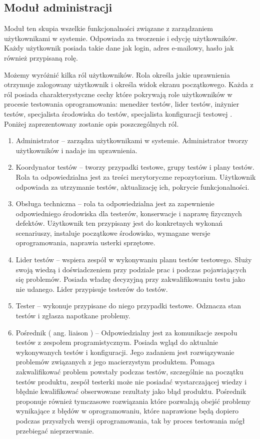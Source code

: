 \subsection{Moduł administracji}

Moduł ten skupia wszelkie funkcjonalności związane z zarządzaniem użytkownikami w systemie. Odpowiada za tworzenie i edycję użytkowników. Każdy użytkownik posiada takie dane jak login, adres e-mailowy, hasło jak również przypisaną rolę.

Możemy wyróżnić kilka ról użytkowników. Rola określa jakie uprawnienia otrzymuje zalogowany użytkownik i określa widok ekranu początkowego. Każda z ról posiada charakterystyczne cechy które pokrywają role użytkowników w procesie testowania oprogramowania: menedżer testów, lider testów, inżynier testów, specjalista środowiska do testów, specjalista konfiguracji testowej \cite{peopleWare}. Poniżej zaprezentowany zostanie opis poszczególnych ról.
\begin{enumerate}
  \item Administrator --  zarządza użytkownikami w systemie. Administrator tworzy użytkowników i nadaje im uprawnienia.
  \item Koordynator testów -- tworzy przypadki testowe, grupy testów i plany testów. Rola ta odpowiedzialna jest za treści merytoryczne repozytorium. Użytkownik odpowiada za utrzymanie testów, aktualizację ich, pokrycie funkcjonalności. 
  \item Obsługa techniczna -- rola ta odpowiedzialna jest za zapewnienie odpowiedniego środowiska dla testerów, konserwacje i naprawę fizycznych defektów. Użytkownik ten przypisany jest do konkretnych wykonań scenariuszy, instaluje początkowe środowisko, wymagane wersje oprogramowania, naprawia usterki sprzętowe.
  \item Lider testów -- wspiera zespół w wykonywaniu planu testów testowego. Służy swoją wiedzą i doświadczeniem przy podziale prac i podczas pojawiających się problemów. Posiada władzę decyzyjną przy zakwalifikowaniu testu jako nie udanego. Lider przypisuje testerów do testów.
  \item Tester --  wykonuje przypisane do niego przypadki testowe. Odznacza stan testów i zgłasza napotkane problemy.
  \item Pośrednik ( ang. liaison ) --  Odpowiedzialny jest za komunikacje zespołu testów z zespołem programistycznym. Posiada wgląd do aktualnie wykonywanych testów i konfiguracji. Jego zadaniem jest rozwiązywanie problemów związanych z jego macierzystym produktem. Pomaga zakwalifikować problem powstały podczas testów, szczególnie na początku testów produktu, zespół testerki może nie posiadać wystarczającej wiedzy i błędnie kwalifikować obserwowane rezultaty jako błąd produktu. Pośrednik proponuje również tymczasowe rozwiązania które pozwalają obejść problemy wynikające z błędów w oprogramowaniu, które naprawione będą dopiero podczas przyszłych wersji oprogramowania, tak by proces testowania mógł przebiegać nieprzerwanie.
\end{enumerate}
  
